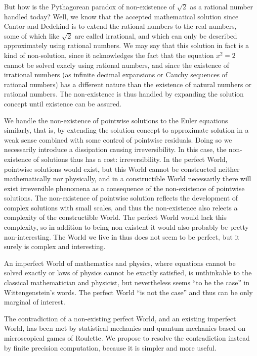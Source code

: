 But how is the Pythagorean paradox of non-existence of $\sqrt{2}$ 
as a rational number handled today? Well, we know that the 
accepted mathematical solution since Cantor and Dedekind is to extend
the rational numbers to the real numbers, some of which like
$\sqrt{2}$ are called irrational, and which can only be described
approximately using rational numbers. We may say that this solution
in fact is a kind of non-solution, since it acknowledges the fact that
the equation $x^2=2$ cannot be solved exacly using rational numbers,
and since the existence of irrational numbers
(as infinite decimal expansions or Cauchy sequences of rational numbers)
has a different nature than the existence of natural numbers or rational
numbers. The non-existence is thus handled by expanding the solution concept
until existence can be assured.

We handle the non-existence of pointwise solutions to the Euler equations 
similarly, that is,
by extending the solution concept to approximate solution
in a weak sense combined with some control of pointwise residuals.
Doing so we necessarily introduce a dissipation causing irreversibility.
In this case, the non-existence of solutions thus has a cost:  
irreversibility. In the perfect World, pointwise solutions would exist,
but this World cannot be constructed neither mathematically nor physically,
and in a constructible World necessarily there will exist irreversible
phenomena as a consequence of the non-existence of pointwise solutions.
The non-existence of pointwise solution reflects the development of
complex solutions with small scales, and thus the non-existence also
relects a complexity of the constructible World. The perfect World
would lack this complexity, so in addition to being non-existent 
it would also probably be pretty non-interesting.  The World we live in thus 
does not seem to be perfect, but it surely is complex and interesting.

An imperfect World of mathematics and physics, where
equations cannot be solved exactly or laws of physics cannot be exactly 
satisfied, is unthinkable to the classical mathematician and 
physicist, but nevertheless seems ``to be the case'' in Wittengenstein's
words. The perfect World ``is not the case'' and thus 
can be only marginal of interest.

The contradiction of a non-existing perfect World, and an existing
imperfect World, has been met by statistical mechanics and quantum mechanics
based on microscopical games of Roulette. We propose to resolve
the contradiction instead by finite precision computation, because
it is simpler and more useful.

